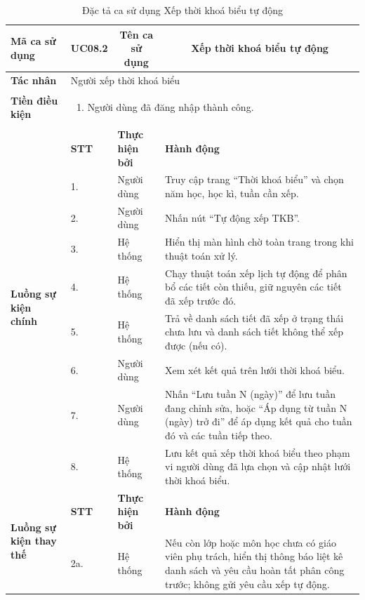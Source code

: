 \documentclass[../DoAn.tex]{subfiles}
\begin{document}
\begin{longtable}{|p{2.8cm}|p{1cm}|p{2.8cm}|p{6.3cm}|}
\caption{Đặc tả ca sử dụng Xếp thời khoá biểu tự động}
\label{tab:uc_xep_tkb_tu_dong} \\
\hline
\multicolumn{1}{|l|}{\textbf{Mã ca sử dụng}} & \multicolumn{1}{c|}{UC08.2} & \multicolumn{1}{c|}{\textbf{Tên ca sử dụng}} & \multicolumn{1}{c|}{Xếp thời khoá biểu tự động} \\
\hline
\multicolumn{1}{|l|}{\textbf{Tác nhân}} & \multicolumn{3}{l|}{Người xếp thời khoá biểu} \\
\hline
\multicolumn{1}{|l|}{\textbf{Tiền điều kiện}} & \multicolumn{3}{p{10.5cm}|}{
\begin{enumerate}[noitemsep, topsep=2pt]
    \item Người dùng đã đăng nhập thành công.
\end{enumerate}} \\
\hline
\multirow{9}{2.8cm}{\textbf{Luồng sự kiện chính}} & \textbf{STT} & \textbf{Thực hiện bởi} & \textbf{Hành động} \\
\cline{2-4}
& 1. & Người dùng & Truy cập trang ``Thời khoá biểu'' và chọn năm học, học kì, tuần cần xếp. \\
\cline{2-4}
& 2. & Người dùng & Nhấn nút ``Tự động xếp TKB''. \\
\cline{2-4}
& 3. & Hệ thống & Hiển thị màn hình chờ toàn trang trong khi thuật toán xử lý. \\
\cline{2-4}
& 4. & Hệ thống & Chạy thuật toán xếp lịch tự động để phân bổ các tiết còn thiếu, giữ nguyên các tiết đã xếp trước đó. \\
\cline{2-4}
& 5. & Hệ thống & Trả về danh sách tiết đã xếp ở trạng thái chưa lưu và danh sách tiết không thể xếp được (nếu có). \\
\cline{2-4}
& 6. & Người dùng & Xem xét kết quả trên lưới thời khoá biểu. \\
\cline{2-4}
& 7. & Người dùng & Nhấn ``Lưu tuần N (ngày)'' để lưu tuần đang chỉnh sửa, hoặc ``Áp dụng từ tuần N (ngày) trở đi'' để áp dụng kết quả cho tuần đó và các tuần tiếp theo. \\
\cline{2-4}
& 8. & Hệ thống & Lưu kết quả xếp thời khoá biểu theo phạm vi người dùng đã lựa chọn và cập nhật lưới thời khoá biểu. \\
\hline
\multirow{5}{2.8cm}{\textbf{Luồng sự kiện thay thế}} & \textbf{STT} & \textbf{Thực hiện bởi} & \textbf{Hành động} \\
\cline{2-4}
& 2a. & Hệ thống & Nếu còn lớp hoặc môn học chưa có giáo viên phụ trách, hiển thị thông báo liệt kê danh sách và yêu cầu hoàn tất phân công trước; không gửi yêu cầu xếp tự động. \\

\end{longtable}
\end{document}
